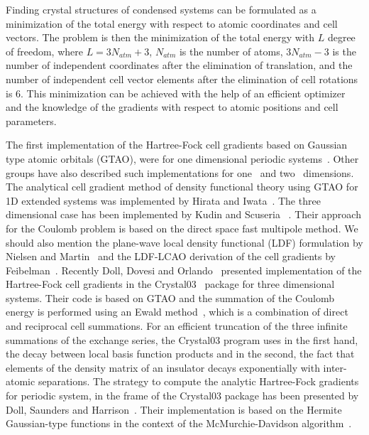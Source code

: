\documentclass[prl,twocolumn,showpacs,twocolumngrid,superbib]{revtex4}
\begin{document}
Finding crystal structures of condensed systems can
be formulated as a minimization of the total energy 
with respect to atomic coordinates and cell vectors.
The problem is then the minimization of the total energy with $L$ degree of freedom, where
$L=3N_{atm}+3$, $N_{atm}$ is the number of atoms, $3N_{atm}-3$ is the number
of independent coordinates after the elimination of translation, 
and the number of independent cell vector elements
after the elimination of cell rotations is 6.
This minimization can be achieved with the help of an efficient optimizer~\cite{KNemeth04,TBucko05,KNemeth05}
and the knowledge of the gradients with respect to atomic positions and cell parameters.
                                  
The first implementation of the Hartree-Fock cell gradients based on 
Gaussian type atomic orbitals (GTAO),
were for one dimensional periodic systems~\cite{HTeramae83,HTeramae84}. 
Other groups have also described such implementations for 
one~\cite{DJacquemin99A,DJacquemin99B} and two~\cite{MTobita03} dimensions. 
The analytical cell gradient method of density functional theory using GTAO for 
1D extended systems was implemented by Hirata and Iwata~\cite{SHirata98}.
The three dimensional case has been implemented by Kudin and Scuseria 
~\cite{KKudin00A,KKudin00B}. Their approach for the Coulomb problem is 
based on the direct space fast multipole method.
We should also mention the plane-wave local density functional (LDF) formulation
by Nielsen and Martin~\cite{ONielsen85} and the LDF-LCAO derivation of 
the cell gradients by Feibelman~\cite{PFeibelman91}.
Recently Doll, Dovesi and Orlando~\cite{KDoll04} presented 
implementation of the Hartree-Fock cell gradients in 
the {\sc Crystal03}~\cite{RDovesi00} package for three dimensional systems. 
Their code is based on GTAO and the summation 
of the Coulomb energy is performed using an Ewald method~\cite{PEwald21}, 
which is a combination of direct and reciprocal cell summations.
For an efficient truncation of the three infinite summations of the exchange
series, the {\sc Crystal03} program uses in the first hand, the decay between local basis function 
products and in the second, the fact that elements of the density 
matrix of an insulator decays exponentially with inter-atomic separations.
The strategy to compute the analytic Hartree-Fock gradients for 
periodic system, in the frame of the {\sc Crystal03} package has been 
presented by Doll, Saunders and Harrison~\cite{KDoll01}.
Their implementation is based on the Hermite Gaussian-type functions
in the context of the McMurchie-Davidson algorithm~\cite{LMcmurchie78}.
\end{document}
